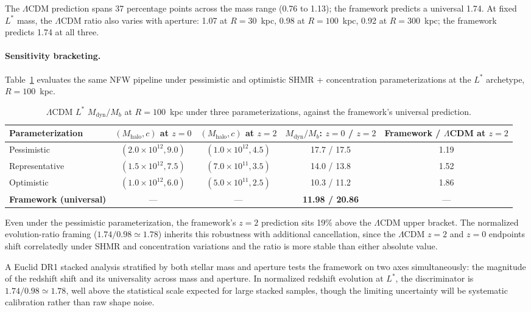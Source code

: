 \documentclass[
    aps,
    prd,
    reprint,
    superscriptaddress,
    nofootinbib,
    floatfix
]{revtex4-2}
\begin{document}
The $\Lambda$CDM prediction spans 37 percentage points across the
mass range (0.76 to 1.13); the framework predicts a universal
1.74. At fixed $L^*$ mass, the $\Lambda$CDM ratio also varies with
aperture: 1.07 at $R = 30$~kpc, 0.98 at $R = 100$~kpc, 0.92 at
$R = 300$~kpc; the framework predicts 1.74 at all three.

\paragraph*{Sensitivity bracketing.}
Table~\ref{tab:bracketing} evaluates the same NFW pipeline under
pessimistic and optimistic SHMR + concentration parameterizations at
the $L^*$ archetype, $R = 100$~kpc.

\begin{table}[tb]
\caption{\label{tab:bracketing}$\Lambda$CDM $L^*$ $M_\text{dyn}/M_b$
at $R = 100$~kpc under three parameterizations, against the
framework's universal prediction.}
\begin{ruledtabular}
\begin{tabular}{lcccc}
Parameterization
  & $(M_\text{halo}, c)$ at $z = 0$
  & $(M_\text{halo}, c)$ at $z = 2$
  & $M_\text{dyn}/M_b$: $z{=}0$ / $z{=}2$
  & Framework / $\Lambda$CDM at $z{=}2$ \\
\hline
Pessimistic
  & $(2.0 \times 10^{12}, 9.0)$
  & $(1.0 \times 10^{12}, 4.5)$
  & 17.7 / 17.5
  & 1.19 \\
Representative
  & $(1.5 \times 10^{12}, 7.5)$
  & $(7.0 \times 10^{11}, 3.5)$
  & 14.0 / 13.8
  & 1.52 \\
Optimistic
  & $(1.0 \times 10^{12}, 6.0)$
  & $(5.0 \times 10^{11}, 2.5)$
  & 10.3 / 11.2
  & 1.86 \\
\textbf{Framework (universal)}
  & ---
  & ---
  & \textbf{11.98 / 20.86}
  & --- \\
\end{tabular}
\end{ruledtabular}
\end{table}

Even under the pessimistic parameterization, the framework's
$z = 2$ prediction sits 19\% above the $\Lambda$CDM upper bracket.
The normalized evolution-ratio framing
($1.74/0.98 \simeq 1.78$) inherits this robustness with additional
cancellation, since the $\Lambda$CDM $z = 2$ and $z = 0$ endpoints
shift correlatedly under SHMR and concentration variations and the
ratio is more stable than either absolute value.

A Euclid DR1 stacked analysis stratified by both stellar mass and
aperture tests the framework on two axes simultaneously: the
magnitude of the redshift shift and its universality across mass
and aperture. In normalized redshift evolution at $L^*$, the
discriminator is $1.74/0.98 \simeq 1.78$, well above the
statistical scale expected for large stacked samples, though the
limiting uncertainty will be systematic calibration rather than raw
shape noise.
\end{document}
